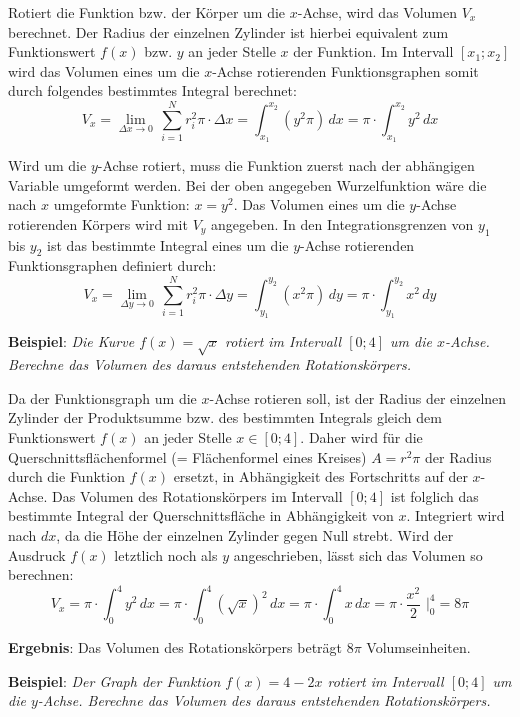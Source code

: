 Rotiert die Funktion bzw. der K\"{o}rper um die $x$-Achse, wird das Volumen $V_x$ berechnet. Der Radius der einzelnen Zylinder ist hierbei equivalent zum Funktionswert $f(x)$ bzw. $y$ an jeder Stelle $x$ der Funktion. Im Intervall $[x_1 ; x_2 ]$ wird das Volumen eines um die $x$-Achse rotierenden Funktionsgraphen somit durch folgendes bestimmtes Integral berechnet: $$V_x = \lim_{\Delta x \rightarrow 0} \, \sum_{i=1}^{N} r_i^2 \pi \cdot \Delta x = \int_{x_1}^{x_2} (y^2 \pi) \, dx = \pi \cdot \int_{x_1}^{x_2} y^2 \, dx$$ 

Wird um die $y$-Achse rotiert, muss die Funktion zuerst nach der abh\"{a}ngigen Variable umgeformt werden. Bei der oben angegeben Wurzelfunktion w\"{a}re die nach $x$ umgeformte Funktion: $x = y^2$. Das Volumen eines um die $y$-Achse rotierenden K\"{o}rpers wird mit $V_y$ angegeben. In den Integrationsgrenzen von $y_1$ bis $y_2$ ist das bestimmte Integral eines um die $y$-Achse rotierenden Funktionsgraphen definiert durch: $$V_x = \lim_{\Delta y \rightarrow 0} \, \sum_{i=1}^{N} r_i^2 \pi \cdot \Delta y = \int_{y_1}^{y_2} (x^2 \pi) \, dy = \pi \cdot \int_{y_1}^{y_2} x^2 \, dy$$ 

\pagebreak

\textbf{Beispiel}: \emph{Die Kurve $f(x) = \sqrt{x}$ rotiert im Intervall $[0;4]$ um die $x$-Achse. Berechne das Volumen des daraus entstehenden Rotationsk\"{o}rpers.}

Da der Funktionsgraph um die $x$-Achse rotieren soll, ist der Radius der einzelnen Zylinder der Produktsumme bzw. des bestimmten Integrals gleich dem Funktionswert $f(x)$ an jeder Stelle $x \in [0 ; 4]$. Daher wird f\"{u}r die Querschnittsfl\"{a}chenformel (= Fl\"{a}chenformel eines Kreises) $A = r^2 \pi$ der Radius durch die Funktion $f(x)$ ersetzt, in Abh\"{a}ngigkeit des Fortschritts auf der $x$-Achse. Das Volumen des Rotationsk\"{o}rpers im Intervall $[0 ; 4]$ ist folglich das bestimmte Integral der Querschnittsfl\"{a}che in Abh\"{a}ngigkeit von $x$. Integriert wird nach $dx$, da die H\"{o}he der einzelnen Zylinder gegen Null strebt. Wird der Ausdruck $f(x)$ letztlich noch als $y$ angeschrieben, l\"{a}sst sich das Volumen so berechnen: $$V_x = \pi \cdot \int_0^4 y^2 \, dx = \pi \cdot \int_0^4 (\sqrt{x})^2 \, dx = \pi \cdot \int_0^4 x \, dx = \pi \cdot \frac{x^2}{2} \, \, \bigg|_0^4 = 8\pi$$

\textbf{Ergebnis}: Das Volumen des Rotationsk\"{o}rpers betr\"{a}gt $8\pi$ Volumseinheiten. 

\textbf{Beispiel}: \emph{Der Graph der Funktion $f(x) = 4 - 2x$ rotiert im Intervall $[0 ; 4]$ um die $y$-Achse. Berechne das Volumen des daraus entstehenden Rotationsk\"{o}rpers.}

